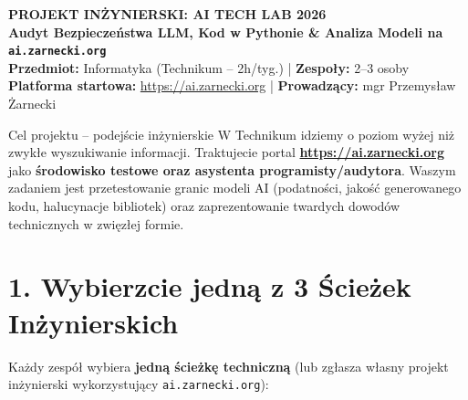\documentclass[11pt,a4paper]{article}
\begin{document}
\begin{center}
    {\LARGE\textbf{PROJEKT INŻYNIERSKI: AI TECH LAB 2026}}\\[5pt]
    {\large\textbf{Audyt Bezpieczeństwa LLM, Kod w Pythonie \& Analiza Modeli na \texttt{ai.zarnecki.org}}}\\[6pt]
    \textbf{Przedmiot:} Informatyka (Technikum -- 2h/tyg.) \quad | \quad \textbf{Zespoły:} 2--3 osoby\\[2pt]
    \textbf{Platforma startowa:} \url{https://ai.zarnecki.org} \quad | \quad \textbf{Prowadzący:} mgr Przemysław Żarnecki
\end{center}

\vspace{0.2cm}

\begin{infobox}{Cel projektu -- podejście inżynierskie}
W Technikum idziemy o poziom wyżej niż zwykłe wyszukiwanie informacji. Traktujecie portal \textbf{\url{https://ai.zarnecki.org}} jako \textbf{środowisko testowe oraz asystenta programisty/audytora}. Waszym zadaniem jest przetestowanie granic modeli AI (podatności, jakość generowanego kodu, halucynacje bibliotek) oraz zaprezentowanie twardych dowodów technicznych w zwięzłej formie.
\end{infobox}

\section{1. Wybierzcie jedną z 3 Ścieżek Inżynierskich}

Każdy zespół wybiera \textbf{jedną ścieżkę techniczną} (lub zgłasza własny projekt inżynierski wykorzystujący \texttt{ai.zarnecki.org}):
\end{document}
